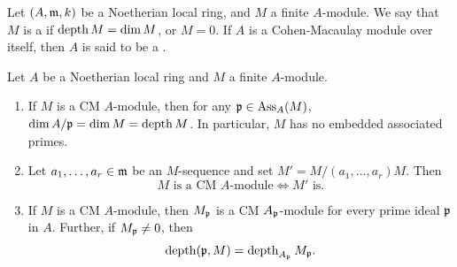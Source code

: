 \begin{theorem}
    Let $(A,\mathfrak{m}, k)$ be a Noetherian local ring, and $M$ a finite $A$-module. We say that $M$ is a  if $\operatorname{depth} M = \dim M$, or $M = 0$. If $A$ is a Cohen-Macaulay module over itself, then $A$ is said to be a .
\end{theorem}

\begin{theorem}
    Let $A$ be a Noetherian local ring and $M$ a finite $A$-module. 
    \begin{enumerate}[label=(\arabic*)]
        \item If $M$ is a CM $A$-module, then for any $\mathfrak{p}\in\operatorname{Ass}_A(M)$, $\dim A/\mathfrak{p} = \dim M = \operatorname{depth} M$. In particular, $M$ has no embedded associated primes.
        \item Let $a_1,\dots,a_r\in\mathfrak{m}$ be an $M$-sequence and set $M' = M/(a_1,\dots,a_r)M$. Then 
        \begin{equation*}
            M\text{ is a CM $A$-module}\iff M'\text{ is.}
        \end{equation*}
        \item If $M$ is a CM $A$-module, then $M_{\mathfrak{p}}$ is a CM $A_{\mathfrak{p}}$-module for every prime ideal $\mathfrak{p}$ in $A$. Further, if $M_{\mathfrak{p}}\ne 0$, then 
        \begin{equation*}
            \operatorname{depth}(\mathfrak{p}, M) = \operatorname{depth}_{A_{\mathfrak{p}}} M_{\mathfrak{p}}.
        \end{equation*}
    \end{enumerate}
\end{theorem}
